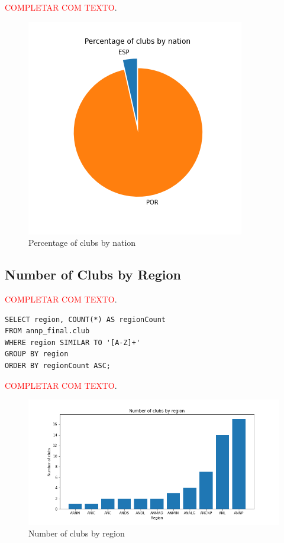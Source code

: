 \textcolor{red}{COMPLETAR COM TEXTO}.

\begin{figure}[H]
    \centering
    \includegraphics[width=.45\textwidth]{img/clubsbynation-pie}
    \caption{Percentage of clubs by nation}
    \label{fig:clubs-by-nation-pie}
\end{figure}

\subsection{Number of Clubs by Region}\label{subsec:number-of-clubs-by-region}

\textcolor{red}{COMPLETAR COM TEXTO}.

\begin{verbatim}
SELECT region, COUNT(*) AS regionCount
FROM annp_final.club
WHERE region SIMILAR TO '[A-Z]+'
GROUP BY region
ORDER BY regionCount ASC;
\end{verbatim}

\textcolor{red}{COMPLETAR COM TEXTO}.

\begin{figure}[H]
    \centering
    \includegraphics[width=.85\textwidth]{img/clubsbyregion}
    \caption{Number of clubs by region}
    \label{fig:clubs-by-region}
\end{figure}